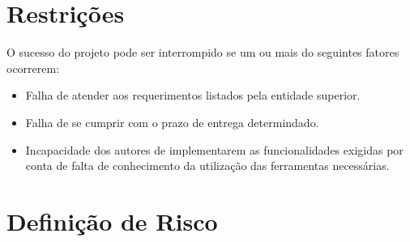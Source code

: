 \section{Restrições}
    O sucesso do projeto pode ser interrompido se um ou mais do seguintes fatores ocorrerem:
    \begin{itemize}
        \item Falha de atender aos requerimentos listados pela entidade superior.
        \item Falha de se cumprir com o prazo de entrega determindado.
        \item Incapacidade dos autores de implementarem as funcionalidades exigidas por conta de falta de conhecimento da utilização das ferramentas necessárias.
    \end{itemize}


\section{Definição de Risco}

